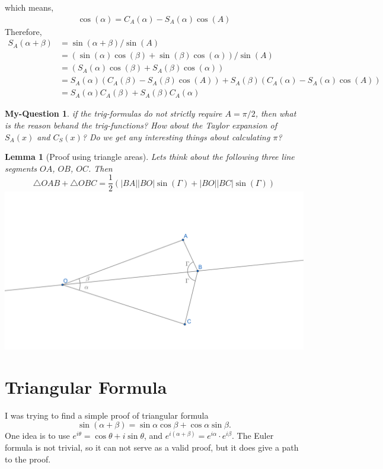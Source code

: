 \documentclass[pdf]{article}
\newtheorem{lemma}[theorem]{Lemma}
\newtheorem{myQuestion}[theorem]{My-Question}
\begin{document}
which means,
\begin{align*}
\cos(\alpha) = C_A(\alpha) - S_A(\alpha)\cos(A)
\end{align*}
Therefore,
\begin{align*}
S_A(\alpha + \beta) &= \sin(\alpha + \beta)/\sin(A)\\
			 &= (\sin(\alpha)\cos(\beta) + \sin(\beta)\cos(\alpha))/\sin(A)\\
			 &= (S_A(\alpha)\cos(\beta) + S_A(\beta)\cos(\alpha))\\
			 &= S_A(\alpha)(C_A(\beta) - S_A(\beta)\cos(A)) + S_A(\beta)(C_A(\alpha) - S_A(\alpha)\cos(A))\\
			 &= S_A(\alpha)C_A(\beta) + S_A(\beta)C_A(\alpha)
\end{align*}
\begin{myQuestion}
if the trig-formulas do not strictly require $A = \pi/2$, then what is the reason behand the trig-functions? How about the Taylor expansion of $S_A(x)$ and $C_S(x)$? Do we get any interesting things about calculating $\pi$?
\end{myQuestion}
\begin{lemma}[Proof using triangle areas] Lets think about the following three line segments $OA$, $OB$, $OC$. Then $$\bigtriangleup OAB + \bigtriangleup OBC = \frac{1}{2}(|BA||BO|\sin(\Gamma) + |BO||BC|\sin(\Gamma))$$
\includegraphics{trig_formula_graph_1}

\end{lemma}

\section{Triangular Formula}
I was  trying to find a simple proof of triangular formula $$\sin(\alpha+\beta) = \sin\alpha\cos\beta + \cos\alpha\sin\beta.$$ One idea is to use $e^{i\theta} = \cos\theta + i\sin\theta$, and $e^{i(\alpha + \beta)} = e^{i\alpha} \cdot e^{i\beta}$. The Euler formula is not trivial, so it can not serve as a valid proof, but it does give a path to the proof.\\
\end{document}
